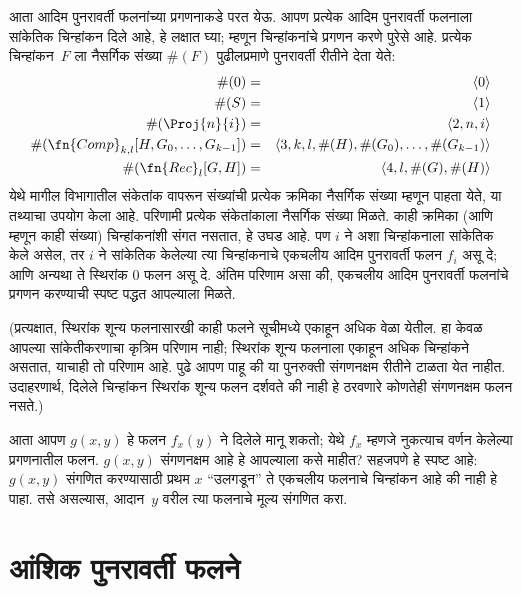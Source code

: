आता आदिम पुनरावर्ती फलनांच्या प्रगणनाकडे परत येऊ. आपण प्रत्येक आदिम
पुनरावर्ती फलनाला सांकेतिक चिन्हांकन दिले आहे, हे लक्षात घ्या; म्हणून
चिन्हांकनांचे प्रगणन करणे पुरेसे आहे. प्रत्येक चिन्हांकन~$F$ ला नैसर्गिक
संख्या $\#(F)$ पुढीलप्रमाणे पुनरावर्ती रीतीने देता येते:
\begin{eqnarray*}
\#(0) & = & \langle 0 \rangle \\
\#(S) & = & \langle 1 \rangle \\
\#(\Proj{n}{i}) & = & \langle 2, n, i \rangle \\
\#(\fn{Comp}_{k,l}[H,G_0,\dots,G_{k-1}]) & = & \langle
3,k,l,\#(H),\#(G_0),\dots,\#(G_{k-1}) \rangle \\
\#(\fn{Rec}_l[G,H]) & = & \langle 4, l, \#(G), \#(H) \rangle
\end{eqnarray*}
येथे मागील विभागातील संकेतांक वापरून संख्यांची प्रत्येक क्रमिका नैसर्गिक
संख्या म्हणून पाहता येते, या तथ्याचा उपयोग केला आहे. परिणामी प्रत्येक
संकेतांकाला नैसर्गिक संख्या मिळते. काही क्रमिका (आणि म्हणून काही संख्या)
चिन्हांकनांशी संगत नसतात, हे उघड आहे. पण $i$ ने अशा चिन्हांकनाला सांकेतिक
केले असेल, तर $i$ ने सांकेतिक केलेल्या त्या चिन्हांकनाचे एकचलीय आदिम
पुनरावर्ती फलन $f_i$ असू दे; आणि
अन्यथा ते स्थिरांक $0$ फलन असू दे. अंतिम परिणाम असा की, एकचलीय आदिम
पुनरावर्ती फलनांचे प्रगणन करण्याची स्पष्ट पद्धत आपल्याला मिळते.

(प्रत्यक्षात, स्थिरांक शून्य फलनासारखी काही फलने सूचीमध्ये एकाहून अधिक वेळा
येतील. हा केवळ आपल्या सांकेतीकरणाचा कृत्रिम परिणाम नाही; स्थिरांक शून्य
फलनाला एकाहून अधिक चिन्हांकने असतात, याचाही तो परिणाम आहे. पुढे आपण पाहू की
या पुनरुक्ती संगणनक्षम रीतीने टाळता येत नाहीत. उदाहरणार्थ, दिलेले चिन्हांकन
स्थिरांक शून्य फलन दर्शवते की नाही हे ठरवणारे कोणतेही संगणनक्षम फलन नसते.)

आता आपण $g(x,y)$ हे फलन $f_x(y)$ ने दिलेले मानू शकतो; येथे $f_x$ म्हणजे
नुकत्याच वर्णन केलेल्या प्रगणनातील फलन. $g(x,y)$ संगणनक्षम आहे हे आपल्याला
कसे माहीत? सहजपणे हे स्पष्ट आहे: $g(x,y)$ संगणित करण्यासाठी प्रथम $x$
``उलगडून'' ते एकचलीय फलनाचे चिन्हांकन आहे की नाही हे पाहा. तसे असल्यास,
आदान~$y$ वरील त्या फलनाचे मूल्य संगणित करा.













\section{आंशिक पुनरावर्ती फलने}\label{cmp:rec:par:sec}


